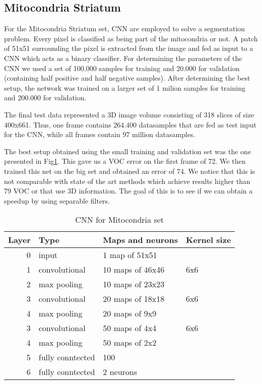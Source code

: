 
\subsection{Mitocondria Striatum}
For the Mitocondria Striatum set, CNN are employed to solve a segmentation problem. Every pixel is classified as being part of the mitocondria or not. A patch of 51x51 surrounding the pixel is extracted from the image and fed as input to a CNN which acts as a binary classifier. For determining the parameters of the CNN we used a set of
100.000 samples for training and 20.000 for validation (containing half positive and half negative samples). After determining the best setup, the network was trained on a larger set of 1 milion samples for training and 200.000 for validation.

The final test data represented a 3D image volume consisting of 318 slices of size 400x661. Thus, one frame contains 264.400 datasamples that are fed as test input for the CNN, while all frames contain 97 million datasamples.

The best setup obtained using the small training and validation set was the one presented in Fig\ref{fig:CNN3}. This gave us a VOC error on the first frame of 72. We then trained this net on the big set and obtained an error of 74. We notice that this is not comparable with state of the art methods which achieve results higher than 79 VOC or that use 3D information. The goal of this
is to see if we can obtain a speedup by using separable filters.

\begin{table}
\centering
\begin{tabular}{@{}rlll@{}}\toprule
Layer & Type & Maps and neurons& Kernel size \\ \midrule
0 & input & 1 map of 51x51 &\\
1& convolutional & 10 maps of 46x46 & 6x6\\
2 & max pooling & 10 maps of 23x23 &  \\
3 & convolutional & 20 maps of 18x18& 6x6 \\
4 & max pooling & 20 maps of 9x9& \\ 
3 & convolutional & 50 maps of 4x4& 6x6 \\
4 & max pooling & 50 maps of 2x2& \\ 
5 & fully conntected& 100 & \\
6 & fully conntected & 2 neurons & \\ \bottomrule
\end{tabular}
\caption{CNN for Mitocondria set}
\label{fig:CNN3}
\end{table}


